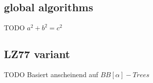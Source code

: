 \documentclass[xcolor=dvipsnames]{beamer}
\begin{document}
\subsection{global algorithms}
\begin{frame}{\FrameName}
	\begin{block}{TODO}
	\Gap
	$a^2 + b^2 = c^2$
\end{block}
\end{frame}

\subsection{LZ77 variant}
\begin{frame}{\FrameName}
	\begin{block}{TODO}
	\Gap
	Basiert anscheinend auf $BB[\alpha]-Trees$
\end{block}
\end{frame}
\end{document}
